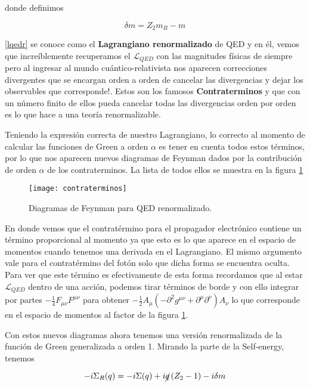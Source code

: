 \documentclass[tickz]{article}
\numberwithin{equation}{section}
\begin{document}
donde definimos 

\begin{equation}\label{deltam}
\delta m = Z_2 m_B - m
\end{equation}

\ref{lqedr} se conoce como el \textbf{Lagrangiano renormalizado} de QED y en él, vemos que increíblemente recuperamos el $ \mathscr{L}_{QED} $ con las magnitudes físicas de siempre pero al ingresar al mundo cuántico-relativista nos aparecen correcciones divergentes que se encargan orden a orden de cancelar las divergencias y dejar los observables que corresponde!. Estos son los famosos \textbf{Contraterminos} y que con un número finito de ellos pueda cancelar todas las divergencias orden por orden es lo que hace a una teoría renormalizable.

Teniendo la expresión correcta de nuestro Lagrangiano, lo correcto al momento de calcular las funciones de Green a orden $ \alpha $ es tener en cuenta todos estos términos, por lo que nos aparecen nuevos diagramas de Feynman dados por la contribución de orden $ \alpha $ de los contraterminos. La lista de todos ellos se muestra en la figura \ref{fig_contraterminos} 

\begin{figure}[h]
	\centering
	\texttt{[image: contraterminos]}
	\caption{Diagramas de Feynman para QED renormalizado.}
	\label{fig_contraterminos}
\end{figure}


En donde vemos que el contratérmino para el propagador electrónico contiene un término proporcional al momento ya que esto es lo que aparece en el espacio de momentos cuando tenemos una derivada en el Lagrangiano. El mismo argumento vale para el contratérmino del fotón solo que dicha forma se encuentra oculta. Para ver que este término es efectivamente de esta forma recordamos que al estar $ \mathscr{L}_{QED} $ dentro de una acción, podemos tirar términos de borde y con ello integrar por partes $ -\frac{1}{4}F_{ \mu\nu}F^{\mu\nu} $  para obtener $ -\frac{1}{2}A_{\mu}\left( -\partial^2 g^{\mu\nu} + \partial^{\mu} \partial^{\nu} \right)A_{\nu}  $ lo que corresponde en el espacio de momentos al factor de la figura \ref{fig_contraterminos}.

Con estos nuevos diagramas ahora tenemos una versión renormalizada de la función de Green generalizada a orden 1. Mirando la parte de la Self-energy, tenemos

\begin{equation}\label{aux8}
-i \Sigma_R(q) = -i \Sigma(q) + i\cancel{q}\left(Z_2 -1\right) -i\delta m
\end{equation}
\end{document}
